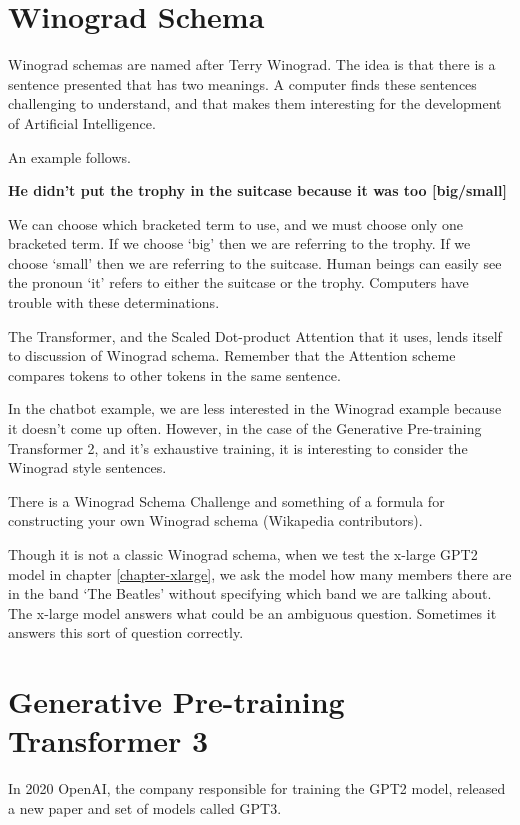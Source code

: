 \section{Winograd Schema}

Winograd schemas are named after Terry Winograd. The idea is that there is a sentence presented that has two meanings. A computer finds these sentences challenging to understand, and that makes them interesting for the development of Artificial Intelligence.

An example follows.

\begin{center}
	\textbf{He didn't put the trophy in the suitcase because it was too [big/small]}
\end{center}

We can choose which bracketed term to use, and we must choose only one bracketed term. If we choose `big' then we are referring to the trophy. If we choose `small' then we are referring to the suitcase. Human beings can easily see the pronoun `it' refers to either the suitcase or the trophy. Computers have trouble with these determinations.

The Transformer, and the Scaled Dot-product Attention that it uses, lends itself to discussion of Winograd schema. Remember that the Attention scheme compares tokens to other tokens in the same sentence. 

In the chatbot example, we are less interested in the Winograd example because it doesn't come up often. However, in the case of the Generative Pre-training Transformer 2, and it's exhaustive training, it is interesting to consider the Winograd style sentences.

There is a Winograd Schema Challenge and something of a formula for constructing your own Winograd schema (Wikapedia contributors). \cite{wiki:xxx}

Though it is not a classic Winograd schema, when we test the x-large GPT2 model in chapter \ref{chapter-xlarge}, we ask the model how many members there are in the band `The Beatles' without specifying which band we are talking about. The x-large model answers what could be an ambiguous question. Sometimes it answers this sort of question correctly.

\section{Generative Pre-training Transformer 3}

In 2020 OpenAI, the company responsible for training the GPT2 model, released a new paper and set of models called GPT3.

